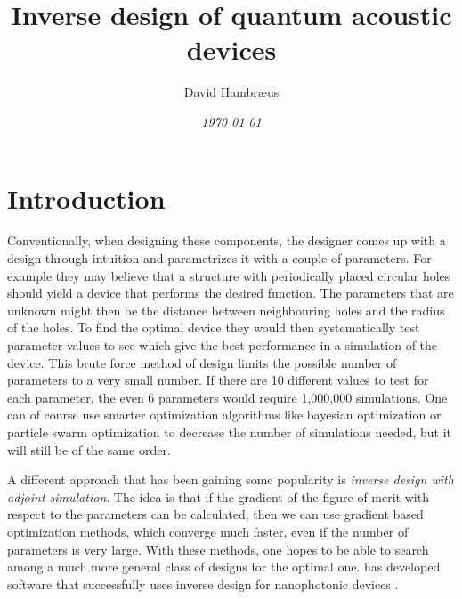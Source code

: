 \documentclass[11pt]{article}
\title{Inverse design of quantum acoustic devices}
\author{David Hambr\ae{}us}
\date{\textit{\today}}
\begin{document}
\maketitle



\tableofcontents

\printglossaries{}

\newpage

\section{Introduction}


Conventionally, when designing these components, the designer comes up with a
design through intuition and parametrizes it with a couple of parameters.
For example they may believe that a structure with periodically placed circular
holes should yield a device that performs the desired function.
The parameters that are unknown might then be the distance between neighbouring
holes and the radius of the holes.
To find the optimal device they would then systematically test parameter values
to see which give the best performance in a simulation of the device.
This brute force method of design limits the possible number of parameters to a
very small number.
If there are 10 different values to test for each parameter, the even 6
parameters would require 1,000,000 simulations.
One can of course use smarter optimization algorithms like bayesian optimization
or particle swarm optimization
to decrease the number of simulations needed, but it will still be of the same
order.

A different approach that has been gaining some popularity is
\emph{inverse design with adjoint simulation}.
The idea is that if the gradient of the figure of merit
with respect to the parameters can be calculated, then we can use gradient based
optimization methods, which converge much faster, even if the number of
parameters is very large. With these methods, one hopes to be able to search
among a much more general class of designs for the optimal one.
\citeauthor{spins2019} has developed software that successfully uses inverse design for
nanophotonic devices \cite{spins2019}.
\end{document}
